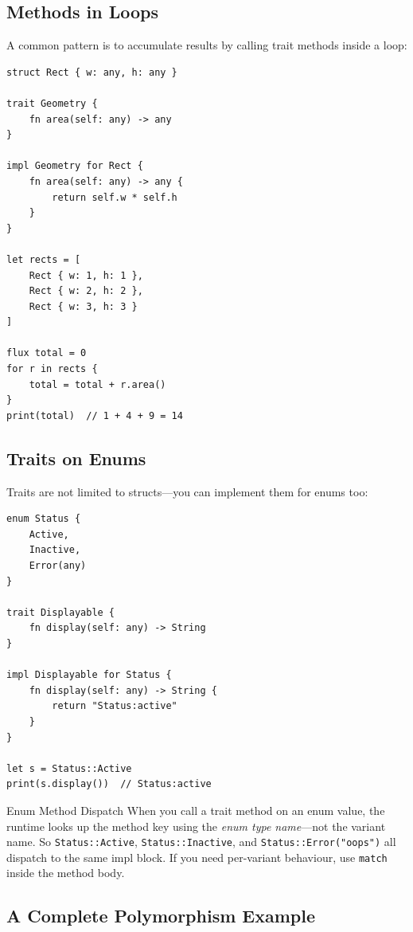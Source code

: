 \subsection{Methods in Loops}

A common pattern is to accumulate results by calling trait methods inside
a loop:

\begin{lstlisting}[language=Lattice, caption={Accumulating over trait methods}]
struct Rect { w: any, h: any }

trait Geometry {
    fn area(self: any) -> any
}

impl Geometry for Rect {
    fn area(self: any) -> any {
        return self.w * self.h
    }
}

let rects = [
    Rect { w: 1, h: 1 },
    Rect { w: 2, h: 2 },
    Rect { w: 3, h: 3 }
]

flux total = 0
for r in rects {
    total = total + r.area()
}
print(total)  // 1 + 4 + 9 = 14
\end{lstlisting}

\subsection{Traits on Enums}

Traits are not limited to structs---you can implement them for enums too:

\begin{lstlisting}[language=Lattice, caption={A trait implemented for an enum}]
enum Status {
    Active,
    Inactive,
    Error(any)
}

trait Displayable {
    fn display(self: any) -> String
}

impl Displayable for Status {
    fn display(self: any) -> String {
        return "Status:active"
    }
}

let s = Status::Active
print(s.display())  // Status:active
\end{lstlisting}

\begin{notebox}{Enum Method Dispatch}
When you call a trait method on an enum value, the runtime looks up the
method key using the \emph{enum type name}---not the variant name. So
\lstinline|Status::Active|, \lstinline|Status::Inactive|, and
\lstinline|Status::Error("oops")| all dispatch to the same impl block.
If you need per-variant behaviour, use \lstinline|match| inside the
method body.
\end{notebox}

\subsection{A Complete Polymorphism Example}

